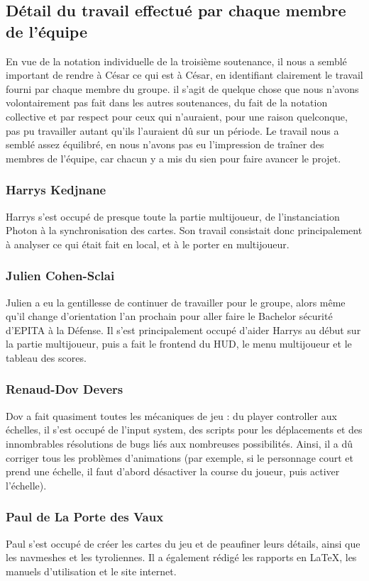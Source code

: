 \subsection{Détail du travail effectué par chaque membre de l'équipe}

    En vue de la notation individuelle de la troisième soutenance, il nous a semblé important de rendre à César ce qui est à César, en identifiant 
    clairement le travail fourni par chaque membre du groupe. il s'agit de quelque chose que nous n'avons volontairement pas fait dans les autres soutenances, 
    du fait de la notation collective et par respect pour ceux qui n'auraient, pour une raison quelconque, pas pu travailler autant qu'ils l'auraient dû sur un période. 
    Le travail nous a semblé assez équilibré, en nous n'avons pas eu l'impression de traîner des membres de l'équipe, car chacun y a mis du sien pour faire 
    avancer le projet.


    \subsubsection{Harrys Kedjnane}

        Harrys s'est occupé de presque toute la partie multijoueur, de l'instanciation Photon à la synchronisation des cartes. Son travail 
        consistait donc principalement à analyser ce qui était fait en local, et à le porter en multijoueur.

    \subsubsection{Julien Cohen-Sclai}

        Julien a eu la gentillesse de continuer de travailler pour le groupe, alors même qu'il change d'orientation l'an prochain pour aller 
        faire le Bachelor sécurité d'EPITA à la Défense. Il s'est principalement occupé d'aider Harrys au début sur la partie multijoueur, 
        puis a fait le frontend du HUD, le menu multijoueur et le tableau des scores.

    \subsubsection{Renaud-Dov Devers}

        Dov a fait quasiment toutes les mécaniques de jeu : du player controller aux échelles, il s'est occupé de l'input system, des scripts 
        pour les déplacements et des innombrables résolutions de bugs liés aux nombreuses possibilités. Ainsi, il a dû corriger tous les problèmes d'animations 
        (par exemple, si le personnage court et prend une échelle, il faut d'abord désactiver la course du joueur, puis activer l'échelle).

    \subsubsection{Paul de La Porte des Vaux}

        Paul s'est occupé de créer les cartes du jeu et de peaufiner leurs détails, ainsi que les navmeshes et les tyroliennes. Il a également 
        rédigé les rapports en LaTeX, les manuels d'utilisation et le site internet.